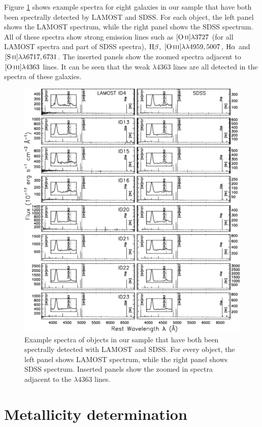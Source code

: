 \documentclass[usenatbib]{raa}
\begin{document}
Figure \ref{spec} shows example spectra for eight galaxies
in our sample that have both been
spectrally detected by LAMOST and SDSS. For each object, the left panel shows 
the 
LAMOST spectrum, while the right panel shows the SDSS spectrum. All of these 
spectra show strong emission lines such as $\hbox{[O\,{\sc ii}]}\lambda3727$ (for all LAMOST 
spectra and
part of SDSS spectra),
$\hbox{H$\beta$}$, $\hbox{[O\,{\sc iii}]}\lambda\lambda4959,5007$, $\hbox{H$\alpha$}$ and $\hbox{[S\,{\sc ii}]}\lambda\lambda6717,6731$.
The inserted panels show the zoomed spectra adjacent to $\hbox{[O\,{\sc iii}]}\lambda4363$ 
lines. It can be seen 
that the weak \oiii$\lambda4363$ lines are all  detected in the spectra of these 
galaxies.
 
\begin{figure}[h]
\center
\includegraphics[width=1.0\textwidth]{fig3.eps}
\caption{Example spectra of objects in our sample that 
have both been spectrally detected with LAMOST and SDSS. 
For every object, the left panel shows LAMOST spectrum, while the right panel
shows SDSS spectrum. Inserted panels show the zoomed in spectra adjacent 
to the \oiii$\lambda4363$ lines.}  
\label{spec}
\end{figure}

\section{Metallicity determination}
\label{metallicity determination}
\end{document}
